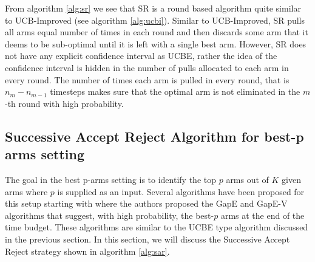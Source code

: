 From algorithm \ref{alg:sr} we see that SR is a round based algorithm quite similar to UCB-Improved (see algorithm \ref{alg:ucbi}). Similar to UCB-Improved, SR pulls all arms equal number of times in each round and then discards some arm that it deems to be sub-optimal until it is left with a single best arm. However, SR does not have any explicit confidence interval as UCBE, rather the idea of the confidence interval is hidden in the number of pulls allocated to each arm in every round. The number of times each arm is pulled in every round, that is $n_m - n_{m-1}$ timesteps makes sure that the optimal arm is not eliminated in the $m$-th round with high probability. 


\subsection{Successive Accept Reject Algorithm for best-p arms setting}

The goal in the best p-arms setting is to identify the top $p$ arms out of $K$ given arms where $p$ is supplied as an input. Several algorithms have been proposed for this setup starting with \citet{gabillon2011multi} where the authors proposed the GapE and GapE-V algorithms that suggest, with high probability, the best-$p$ arms at the end of the time budget. These algorithms are similar to the UCBE type algorithm discussed in the previous section. In this section, we will discuss the Successive Accept Reject strategy shown in algorithm \ref{alg:sar}.


